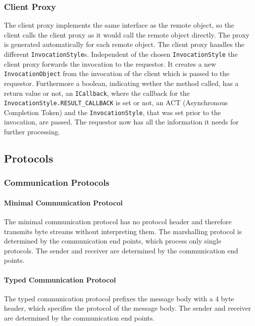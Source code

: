 \subsubsection{Client Proxy}
The client proxy implements the same interface as the remote object, so the client calls the client proxy as it would call the remote object directly. The proxy is generated automatically for each remote object. The client proxy handles the different \texttt{InvocationStyle}s. Independent of the chosen \texttt{InvocationStyle} the client proxy forwards the invocation to the requestor. It creates a new \texttt{InvocationObject} from the invocation of the client which is passed to the requestor. Furthermore a boolean, indicating wether the method called, has a return value or not, an \texttt{ICallback}, where the callback for the \texttt{InvocationStyle.RESULT\_CALLBACK} is set or not, an ACT (Asynchronous Completion Token) and the \texttt{InvocationStyle}, that was set prior to the invocation, are passed. The requestor now has all the information it needs for further processing.


\subsection{Protocols}

\subsubsection{Communication Protocols}

\paragraph{Minimal Communication Protocol}

The minimal communication protocol has no protocol header and therefore transmits byte streams without interpreting them.
The marshalling protocol is determined by the communication end points, which process only single protocols.
The sender and receiver are determined by the communication end points.

\paragraph{Typed Communication Protocol}

The typed communication protocol prefixes the message body with a 4 byte header, which specifies the protocol of the message body.
The sender and receiver are determined by the communication end points.

